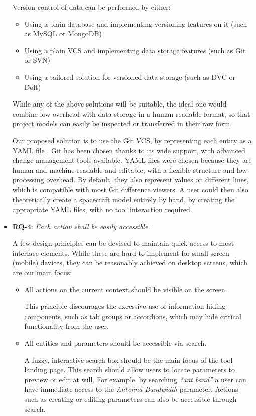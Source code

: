 \documentclass[]{iac}
\begin{document}
\begin{itemize}[itemsep=6pt]
    Version control of data can be performed by either:
    \begin{itemize}[itemsep=0pt]
        \item Using a plain database and implementing versioning features on it (such as MySQL or MongoDB)
        \item Using a plain \ac{VCS} and implementing data storage features (such as Git or SVN)
        \item Using a tailored solution for versioned data storage (such as DVC or Dolt)
    \end{itemize}

    While any of the above solutions will be suitable, the ideal one would combine low overhead with data storage in a human-readable format, so that project models can easily be inspected or transferred in their raw form.

    Our proposed solution is to use the Git \ac{VCS}, by representing each entity as a YAML file \autocite{noauthor_yaml_nodate}. Git has been chosen thanks to its wide support, with advanced change management tools available. YAML files were chosen because they are human and machine-readable and editable, with a flexible structure and low processing overhead. By default, they also represent values on different lines, which is compatible with most Git difference viewers. A user could then also theoretically create a spacecraft model entirely by hand, by creating the appropriate YAML files, with no tool interaction required.

    \item \textbf{RQ-4}: \emph{Each action shall be easily accessible.}

    A few design principles can be devised to maintain quick access to most interface elements. While these are
    hard to implement for small-screen (mobile) devices, they can be reasonably achieved on desktop screens, which
    are our main focus:
    \begin{itemize}
        \item All actions on the current context should be visible on the screen.

        This principle discourages the excessive use of information-hiding components, such as tab groups or accordions, which may hide critical functionality from the user.

        \item All entities and parameters should be accessible via search.

        A fuzzy, interactive search box should be the main focus of the tool landing page. This search should allow users to locate parameters to preview or edit at will. For example, by searching \emph{``ant band''} a user can have immediate access to the \emph{Antenna Bandwidth} parameter. Actions such as creating or editing parameters can also be accessible through search.


\end{itemize}
\end{itemize}
\end{document}
